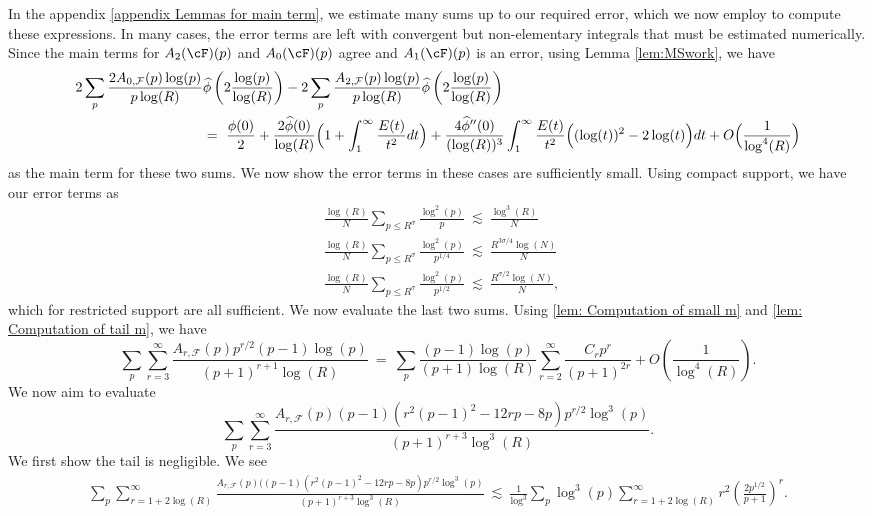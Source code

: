 \documentclass[11pt, reqno]{amsart}
\theoremstyle{definition}
\theoremstyle{remark}
\numberwithin{equation}{section}
\renewcommand{\hat}{\widehat}
\begin{document}
In the appendix \ref{appendix Lemmas for main term}, we estimate many sums up to our required error, which we now employ to compute these expressions. In many cases, the error terms are left with convergent but non-elementary integrals that must be estimated numerically. Since the main terms for $A_2(\cF)(p)$ and $A_0(\cF)(p)$ agree and $A_1(\cF)(p)$ is an error, using Lemma \ref{lem:MSwork}, we have 
\footnotesize
\begin{align*}
    2\sum_p\frac{2A_{0,\mathcal{F}}(p)\log(p)}{p\log(R)}&\hat{\phi}\left(2 \frac{\log(p)}{\log(R)} \right)-2\sum_p\frac{A_{2,\mathcal{F}}(p)\log(p)}{p\log(R)}\hat{\phi}\left(2 \frac{\log(p)}{\log(R)} \right)\\
    &= \ \frac{\phi(0)}{2}
+\frac{2\hat\phi(0)}{\log(R)}\Bigl(1+\int_{1}^{\infty}\frac{E(t)}{t^{2}}dt\Bigr)
+\frac{4\hat\phi''(0)}{(\log(R))^{3}}
\int_{1}^{\infty}\frac{E(t)}{t^{2}}\Bigl((\log(t))^{2}-2\log(t)\Bigr)dt
+O\Bigl(\frac{1}{\log^4(R)}\Bigr)
\end{align*}
\normalsize
as the main term for these two sums. We now show the error terms in these cases are sufficiently small. Using compact support, we have our error terms as
\begin{align}
&\frac{\log(R)}{N}\sum_{p \leq R^{\sigma}}
\frac{\log^2(p)}{p}\ \lesssim\ \frac{\log^3(R)}{N}\nonumber\\
&\frac{\log(R)}{N}\sum_{p \leq R^{\sigma}}\frac{\log^2(p)}{p^{1/4}}\ \lesssim\ \frac{R^{3\sigma/4}\log(N)}{N}\nonumber\\
&\frac{\log(R)}{N}\sum_{p \leq R^{\sigma}}\frac{\log^2(p)}{p^{1/2}}\ \lesssim\ \frac{R^{\sigma/2}\log(N)}{N},\
\end{align}
which for restricted support are all sufficient. We now evaluate the last two sums. Using \eqref{lem: Computation of small m} and \eqref{lem: Computation of tail m}, we have 
\begin{equation}
    \sum_{p}\sum_{r=3}^{\infty}\frac{A_{r, \mathcal{F}}(p)p^{r/2}(p-1)\log(p)}{(p+1)^{r+1}\log(R)}\ =\ \sum_p\frac{(p-1)\log(p)}{(p+1)\log(R)}\sum_{r=2}^{\infty}\frac{C_rp^{r}}{(p+1)^{2r}}+O\left(\frac{1}{\log^4(R)} \right).
\end{equation}
We now aim to evaluate 
$$\sum_p\sum_{r=3}^{\infty}\frac{A_{r, \mathcal{F}}(p)(p-1)(r^2(p-1)^2-12rp-8p)p^{r/2}\log^3(p)}{(p+1)^{r+3}\log^3(R)}.$$
We first show the tail is negligible. We see 
\footnotesize
\begin{align}
    \sum_p\sum_{r=1+2\log(R)}^{\infty}\frac{A_{r, \mathcal{F}}(p)((p-1)(r^2(p-1)^2-12rp-8p)p^{r/2}\log^3(p)}{(p+1)^{r+3}\log^3(R)} \ \lesssim \ \frac{1}{\log^3}\sum_p\log^3(p)\sum_{r=1+2\log(R)}^{\infty} r^2\left(\frac{2p^{1/2}}{p+1} \right)^r.
\end{align}
\end{document}
